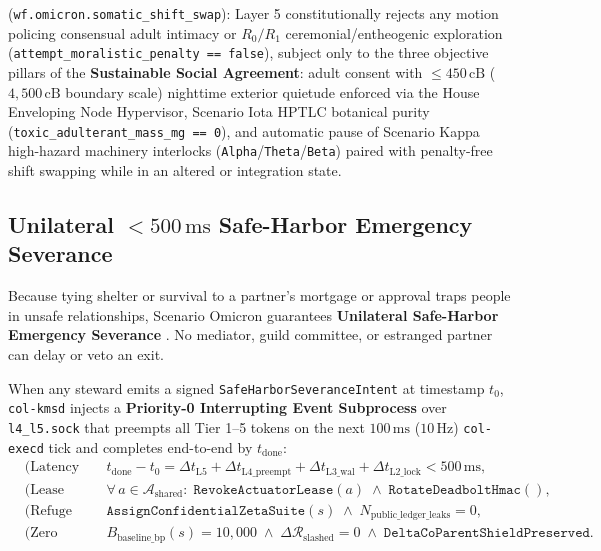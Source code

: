 \begin{enumerate}
{    (\texttt{wf.omicron.somatic\_shift\_swap}):} Layer 5 constitutionally rejects any motion
    policing consensual adult intimacy or $R_0/R_1$ ceremonial/entheogenic exploration
    (\texttt{attempt\_moralistic\_penalty == false}), subject only to the three objective
    pillars of the \textbf{Sustainable Social Agreement}: adult consent with $\le 450\,\mathrm{cB}$
    ($4{,}500\,\mathrm{cB}$ boundary scale) nighttime exterior quietude enforced via the House
    Enveloping Node Hypervisor, Scenario Iota HPTLC botanical purity
    (\texttt{toxic\_adulterant\_mass\_mg == 0}), and automatic pause of Scenario Kappa
    high-hazard machinery interlocks (\texttt{Alpha}/\texttt{Theta}/\texttt{Beta}) paired
    with penalty-free shift swapping while in an altered or integration state.
\end{enumerate}

\subsection{Unilateral $< 500\,\mathrm{ms}$ Safe-Harbor Emergency Severance}

Because tying shelter or survival to a partner's mortgage or approval traps people in
unsafe relationships, Scenario Omicron guarantees \textbf{Unilateral Safe-Harbor Emergency
Severance} \parencite{hirschman1970}. No mediator, guild committee, or estranged partner can
delay or veto an exit.

\begin{invariant}
\label{inv:omicron-safeharbor}
When any steward emits a signed \texttt{SafeHarborSeveranceIntent} at timestamp $t_0$,
\texttt{col-kmsd} injects a \textbf{Priority-0 Interrupting Event Subprocess} over
\texttt{l4\_l5.sock} that preempts all Tier 1--5 tokens on the next $100\,\mathrm{ms}$
($10\,\mathrm{Hz}$) \texttt{col-execd} tick and completes end-to-end by $t_{\mathrm{done}}$:
{\footnotesize
\begin{align}
    &\text{(Latency Bound)} && t_{\mathrm{done}} - t_0 = \Delta t_{\mathrm{L5}} + \Delta t_{\mathrm{L4\_preempt}} + \Delta t_{\mathrm{L3\_wal}} + \Delta t_{\mathrm{L2\_lock}} < 500\,\mathrm{ms}, \label{eq:omicron-500ms}\\
    &\text{(Lease Rotation)} && \forall\,a \in \mathcal{A}_{\mathrm{shared}}:\; \mathtt{RevokeActuatorLease}(a) \;\land\; \mathtt{RotateDeadboltHmac}(), \label{eq:omicron-revoke}\\
    &\text{(Refuge Privacy)} && \mathtt{AssignConfidentialZetaSuite}(s) \;\land\; N_{\mathrm{public\_ledger\_leaks}} = 0, \label{eq:omicron-refuge}\\
    &\text{(Zero Penalty)} && B_{\mathrm{baseline\_bp}}(s) = 10{,}000 \;\land\; \Delta\mathcal{R}_{\mathrm{slashed}} = 0 \;\land\; \mathtt{DeltaCoParentShieldPreserved}. \label{eq:omicron-parity}
\end{align}
}
\end{invariant}

